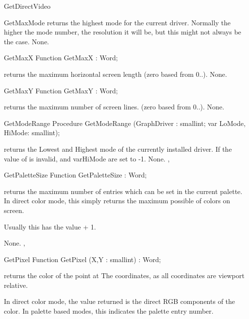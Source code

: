 \begin{function}{GetDirectVideo}
\begin{function}{GetMaxMode}
\Description
{} returns the highest mode for the current driver. Normally
the higher the mode number, the resolution it will be, but this might not
always be the case.
\Errors
None.
\SeeAlso
{}
\end{function}

\begin{function}{GetMaxX}
\Declaration
Function GetMaxX  : Word;

\Description
{} returns the maximum horizontal screen
length (zero based from 0..).
\Errors
None.
\SeeAlso
{}
\end{function}
\begin{function}{GetMaxY}
\Declaration
Function GetMaxY  : Word;

\Description
{} returns the maximum number of screen
lines. (zero based from 0..).
\Errors
None.
\SeeAlso
{}
\end{function}

\begin{procedure}{GetModeRange}
\Declaration
Procedure GetModeRange (GraphDriver : smallint; var LoMode, HiMode: smallint);

\Description
{} returns the Lowest and Highest mode of the currently
installed driver. If the value of  is invalid, 
and var{HiMode} are set to -1.
\Errors
None.
\SeeAlso
{}, 
\end{procedure}
\begin{function}{GetPaletteSize}
\Declaration
Function GetPaletteSize  : Word;

\Description
{} returns the maximum number of entries which
can be set in the current palette. In direct color mode, this simply
returns the maximum possible of colors on screen.

Usually this has the value  + 1.

\Errors
None.
\SeeAlso
{},
\end{function}
\begin{function}{GetPixel}
\Declaration
Function GetPixel (X,Y : smallint) : Word;

\Description
{} returns the color
of the point at  The coordinates, as all coordinates
are viewport relative.

In direct color mode, the value returned is the direct RGB components of
the color. In palette based modes, this indicates the palette entry number.


\end{function}
\end{function}
